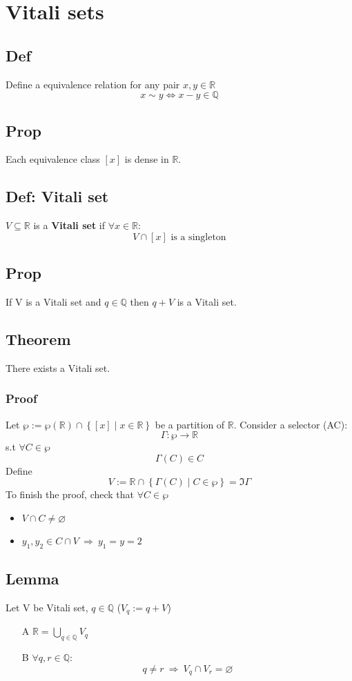 \documentclass{book}
\newcommand{\set}[1]{\left\{#1\right\}}
\begin{document}
\chapter{Vitali sets}
\section{Def}
Define a equivalence relation for any pair $x,y\in \mathbb R$
$$x\sim y\Leftrightarrow x-y\in \mathbb Q$$
\section{Prop}
Each equivalence class $[x]$ is dense in $\mathbb R$.
\section{Def: Vitali set}
$V\subseteq \mathbb R$ is a \textbf{Vitali set} if $\forall x\in \mathbb R$:$$V\cap[x]\text{ is a singleton}$$
\section{Prop}
If V is a Vitali set and $q\in \mathbb Q$ then $q+V$ is a Vitali set.
\section{Theorem}
There exists a Vitali set.
\subsection*{Proof}
Let $\wp:=\wp(\mathbb R)\cap\set{[x]\mid x\in \mathbb R}$ be a partition of $\mathbb R$. Consider a selector (AC):$$\Gamma:\wp\to \mathbb R$$
s.t $\forall C\in \wp$$$\Gamma(C)\in C$$
Define $$V:=\mathbb R\cap\set{\Gamma(C)\mid C\in \wp}=\Im\Gamma$$
To finish the proof, check that $\forall C\in \wp$\begin{itemize}
    \item $V\cap C\neq\varnothing$
    \item $y_1,y_2\in C\cap V\ \Rightarrow\ y_1=y=2$
\end{itemize}
\section{Lemma}
\label{lemma 3.3.4}
Let V be Vitali set, $q\in \mathbb Q$ ($V_q:=q+V$)\begin{itemize}
    \item[A] $\mathbb R=\bigcup\limits_{q\in \mathbb Q}V_q$
    \item[B] $\forall q,r\in \mathbb Q$:$$q\neq r\ \Rightarrow\ V_q\cap V_r=\varnothing$$
\end{itemize}
\end{document}
